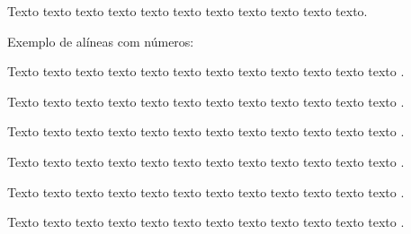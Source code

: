 
    Texto texto texto texto texto texto texto texto texto texto texto.



    Exemplo de alíneas com números:

    \begin{alineascomnumero}
	    \item Texto texto texto texto texto texto texto texto texto texto texto texto .
	    \item Texto texto texto texto texto texto texto texto texto texto texto texto .
	    \item Texto texto texto texto texto texto texto texto texto texto texto texto .
	    \item Texto texto texto texto texto texto texto texto texto texto texto texto .
	    \item Texto texto texto texto texto texto texto texto texto texto texto texto .
	    \item Texto texto texto texto texto texto texto texto texto texto texto texto .
    \end{alineascomnumero}

